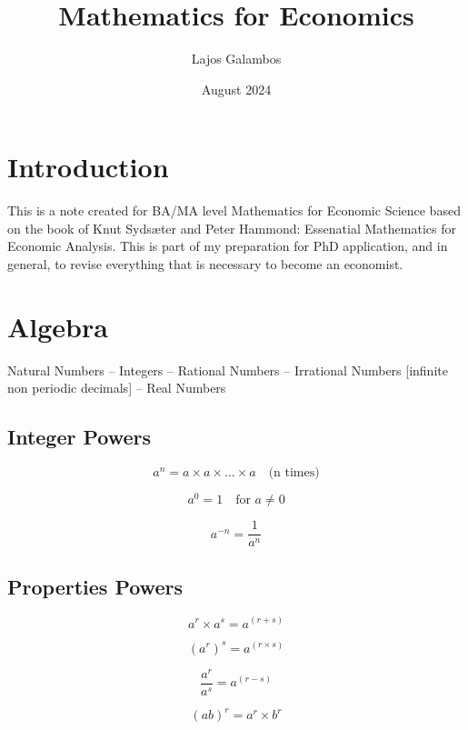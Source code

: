 \documentclass{article}
\title{Mathematics for Economics}
\author{Lajos Galambos}
\date{August 2024}
\begin{document}
\maketitle

\section{Introduction}
This is a note created for BA/MA level Mathematics for Economic Science based on the book of Knut Sydsæter and Peter Hammond: Essenatial Mathematics for Economic Analysis. This is part of my preparation for PhD application, and in general, to revise everything that is necessary to become an economist. 

\section{Algebra}
Natural Numbers – Integers – Rational Numbers – Irrational Numbers [infinite non periodic decimals] – Real Numbers

\subsection{Integer Powers}
\begin{equation}
  a^n = a \times a \times \ldots \times a \quad \text{(n times)}
\end{equation}

\begin{equation}
  a^0 = 1 \quad \text{for } a \neq 0
\end{equation}

\begin{equation}
  a^{-n} = \frac{1}{a^n}
\end{equation}

\subsection{Properties Powers}
\begin{equation}
  a^r \times a^s = a^{(r+s)}
\end{equation}

\begin{equation}
  (a^r)^s = a^{(r \times s)}
\end{equation}

\begin{equation}
  \frac{a^r}{a^s} = a^{(r - s)}
\end{equation}

\begin{equation}
  (ab)^r = a^r \times b^r
\end{equation}
\end{document}
